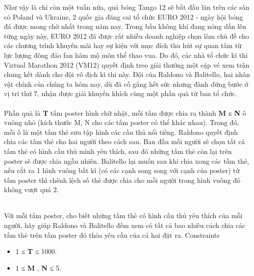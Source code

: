Như vậy là chỉ còn một tuần nữa, quả bóng Tango 12 sẽ bắt đầu lăn trên các sân cỏ Poland và Ukraine, 2 quốc gia đăng cai tổ chức EURO 2012 - ngày hội bóng đá được mong chờ nhất trong năm nay. Trong bầu không khí đang nóng dần lên từng ngày này, EURO 2012 đã được rất nhiều doanh nghiệp chọn làm chủ đề cho các chương trình khuyến mãi hay sự kiện với mục đích thu hút sự quan tâm từ lực lượng đông đảo fan hâm mộ môn thể thao vua. Do đó, các nhà tổ chức kì thi Virtual Marathon 2012 (VM12) quyết định treo giải thưởng một cặp vé xem trận chung kết dành cho đội vô địch kì thi này. Đội của Raldono và Balitello, hai nhân vật chính của chúng ta hôm nay, dù đã cố gắng hết sức nhưng đành dừng bước ở vị trí thứ 7, nhận được giải khuyến khích cùng một phần quà từ ban tổ chức.
\\
\\Phần quà là \textbf{ T } tấm poster hình chữ nhật, mỗi tấm được chia ra thành \textbf{ M } x \textbf{ N } ô vuông nhỏ (kích thước M, N cho các tấm poster có thể khác nhau). Trong đó, mỗi ô là một tấm thẻ sưu tập hình các cầu thủ nổi tiếng. Raldono quyết định chia các tấm thẻ cho hai người theo cách sau. Ban đầu mỗi người sẽ chọn tất cả tấm thẻ có hình cầu thủ mình yêu thích, sau đó những tấm thẻ còn lại trên poster sẽ được chia ngẫu nhiên. Balitello lại muốn sau khi chia xong các tấm thẻ, nếu cắt ra 1 hình vuông bất kì (có các cạnh song song với cạnh của poster) từ tấm poster thì chênh lệch số thẻ được chia cho mỗi người trong hình vuông đó không vượt quá 2.


\\Với mỗi tấm poster, cho biết những tấm thẻ có hình cầu thủ yêu thích của mỗi người, hãy giúp Raldono và Balitello đếm xem có tất cả bao nhiêu cách chia các tấm thẻ trên tấm poster đó thỏa yêu cầu của cả hai đặt ra.
Constraints
\begin{itemize}
	\item 1 ≤ \textbf{ T } ≤ 1000.
\end{itemize}
\begin{itemize}
	\item 1 ≤ \textbf{ M } , \textbf{ N } ≤ 5.
\end{itemize}
